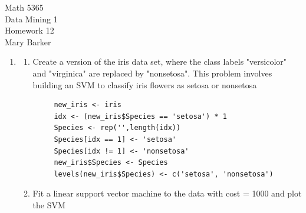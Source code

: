 \documentclass[11pt]{article}
\begin{document}
\noindent\large{Math 5365}\\
\large{Data Mining 1}\\
\large{Homework 12}\\
\large{Mary Barker}
\doublespace
\begin{enumerate}
\item 
  \begin{enumerate}
    \item
    Create a version of the iris data set, where the class labels 
    "versicolor" and "virginica" are replaced by "nonsetosa". This 
    problem involves building an SVM to classify iris flowers as 
    setosa or nonsetosa

     \begin{Verbatim}
     new_iris <- iris
     idx <- (new_iris$Species == 'setosa') * 1
     Species <- rep('',length(idx))
     Species[idx == 1] <- 'setosa'
     Species[idx != 1] <- 'nonsetosa'
     new_iris$Species <- Species
     levels(new_iris$Species) <- c('setosa', 'nonsetosa')
     \end{Verbatim}

\item
Fit a linear support vector machine to the data with cost = 1000 
 and plot the SVM


\end{enumerate}
\end{enumerate}
\end{document}
